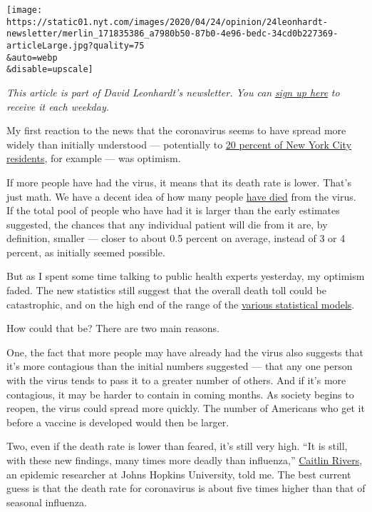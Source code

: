 \texttt{[image: https://static01.nyt.com/images/2020/04/24/opinion/24leonhardt-newsletter/merlin\_171835386\_a7980b50-87b0-4e96-bedc-34cd0b227369-articleLarge.jpg?quality=75\\\&auto=webp\\\&disable=upscale]}

\emph{This article is part of David Leonhardt's newsletter. You can}
\href{https://www.nytimes.com/newsletters/opiniontoday?action=click\&module=Intentional\&pgtype=Article}{\emph{sign
up here}} \emph{to receive it each weekday.}

My first reaction to the news that the coronavirus seems to have spread
more widely than initially understood --- potentially to
\href{https://www.nytimes.com/2020/04/23/nyregion/coronavirus-antibodies-test-ny.html}{20
percent of New York City residents}, for example --- was optimism.

If more people have had the virus, it means that its death rate is
lower. That's just math. We have a decent idea of how many people
\href{https://coronavirus.jhu.edu/map.html}{have died} from the virus.
If the total pool of people who have had it is larger than the early
estimates suggested, the chances that any individual patient will die
from it are, by definition, smaller --- closer to about 0.5 percent on
average, instead of 3 or 4 percent, as initially seemed possible.

But as I spent some time talking to public health experts yesterday, my
optimism faded. The new statistics still suggest that the overall death
toll could be catastrophic, and on the high end of the range of the
\href{https://www.washingtonpost.com/outlook/2020/04/14/coronavirus-models-ihme-ic/}{various
statistical models}.

How could that be? There are two main reasons.

One, the fact that more people may have already had the virus also
suggests that it's more contagious than the initial numbers suggested
--- that any one person with the virus tends to pass it to a greater
number of others. And if it's more contagious, it may be harder to
contain in coming months. As society begins to reopen, the virus could
spread more quickly. The number of Americans who get it before a vaccine
is developed would then be larger.

Two, even if the death rate is lower than feared, it's still very high.
``It is still, with these new findings, many times more deadly than
influenza,''
\href{https://twitter.com/cmyeaton?ref_src=twsrc\%5Egoogle\%7Ctwcamp\%5Eserp\%7Ctwgr\%5Eauthor}{Caitlin
Rivers}, an epidemic researcher at Johns Hopkins University, told me.
The best current guess is that the death rate for coronavirus is about
five times higher than that of seasonal influenza.

